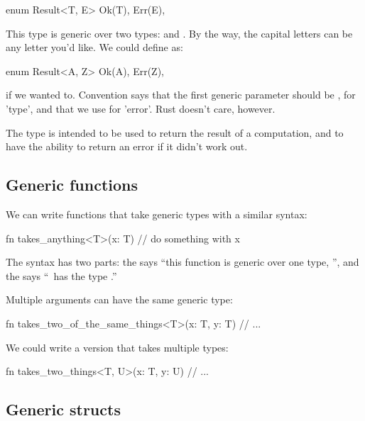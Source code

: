 \begin{rustc}
enum Result<T, E> {
    Ok(T),
    Err(E),
}
\end{rustc}

This type is generic over two types:  and . By the way, the capital letters can be any letter you'd like. We could define 
 as:

\begin{rustc}
enum Result<A, Z> {
    Ok(A),
    Err(Z),
}
\end{rustc}

if we wanted to. Convention says that the first generic parameter should be , for 'type', and that we use  for 'error'. Rust 
doesn't care, however.

\blank

The  type is intended to be used to return the result of a computation, and to have the ability to return an error if it 
didn't work out.

\subsection*{Generic functions}

We can write functions that take generic types with a similar syntax:

\begin{rustc}
fn takes_anything<T>(x: T) {
    // do something with x
}
\end{rustc}

The syntax has two parts: the  says \enquote{this function is generic over one type, }, and the  says 
\enquote{\x\ has the type .}

\blank

Multiple arguments can have the same generic type:

\begin{rustc}
fn takes_two_of_the_same_things<T>(x: T, y: T) {
    // ...
}
\end{rustc}

We could write a version that takes multiple types:

\begin{rustc}
fn takes_two_things<T, U>(x: T, y: U) {
    // ...
}
\end{rustc}

\subsection*{Generic structs}


